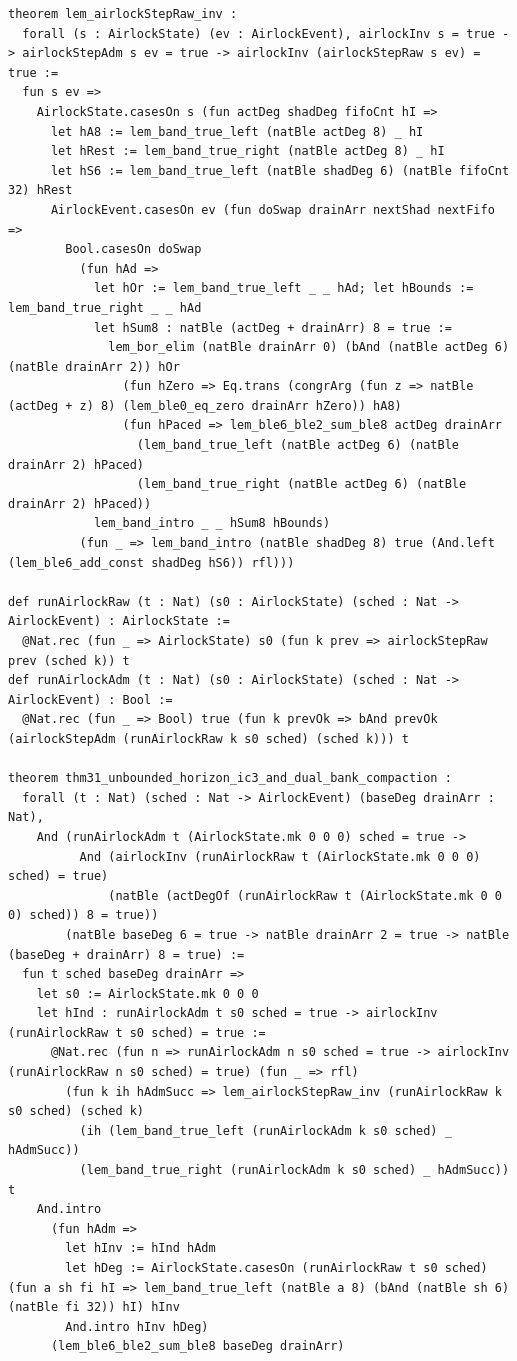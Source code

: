 \documentclass[11pt,letterpaper]{article}
\theoremstyle{spectralthm}
\begin{document}
\begin{lstlisting}[language=Lean4,caption={Standalone Pure Init.Prelude Term-Mode Lean 4 Kernel Suite (thm30--thm61, v0.0.0, 0 sorry, 0 axioms).},label={lst:lean_unified}]
theorem lem_airlockStepRaw_inv :
  forall (s : AirlockState) (ev : AirlockEvent), airlockInv s = true -> airlockStepAdm s ev = true -> airlockInv (airlockStepRaw s ev) = true :=
  fun s ev =>
    AirlockState.casesOn s (fun actDeg shadDeg fifoCnt hI =>
      let hA8 := lem_band_true_left (natBle actDeg 8) _ hI
      let hRest := lem_band_true_right (natBle actDeg 8) _ hI
      let hS6 := lem_band_true_left (natBle shadDeg 6) (natBle fifoCnt 32) hRest
      AirlockEvent.casesOn ev (fun doSwap drainArr nextShad nextFifo =>
        Bool.casesOn doSwap
          (fun hAd =>
            let hOr := lem_band_true_left _ _ hAd; let hBounds := lem_band_true_right _ _ hAd
            let hSum8 : natBle (actDeg + drainArr) 8 = true :=
              lem_bor_elim (natBle drainArr 0) (bAnd (natBle actDeg 6) (natBle drainArr 2)) hOr
                (fun hZero => Eq.trans (congrArg (fun z => natBle (actDeg + z) 8) (lem_ble0_eq_zero drainArr hZero)) hA8)
                (fun hPaced => lem_ble6_ble2_sum_ble8 actDeg drainArr
                  (lem_band_true_left (natBle actDeg 6) (natBle drainArr 2) hPaced)
                  (lem_band_true_right (natBle actDeg 6) (natBle drainArr 2) hPaced))
            lem_band_intro _ _ hSum8 hBounds)
          (fun _ => lem_band_intro (natBle shadDeg 8) true (And.left (lem_ble6_add_const shadDeg hS6)) rfl)))

def runAirlockRaw (t : Nat) (s0 : AirlockState) (sched : Nat -> AirlockEvent) : AirlockState :=
  @Nat.rec (fun _ => AirlockState) s0 (fun k prev => airlockStepRaw prev (sched k)) t
def runAirlockAdm (t : Nat) (s0 : AirlockState) (sched : Nat -> AirlockEvent) : Bool :=
  @Nat.rec (fun _ => Bool) true (fun k prevOk => bAnd prevOk (airlockStepAdm (runAirlockRaw k s0 sched) (sched k))) t

theorem thm31_unbounded_horizon_ic3_and_dual_bank_compaction :
  forall (t : Nat) (sched : Nat -> AirlockEvent) (baseDeg drainArr : Nat),
    And (runAirlockAdm t (AirlockState.mk 0 0 0) sched = true ->
          And (airlockInv (runAirlockRaw t (AirlockState.mk 0 0 0) sched) = true)
              (natBle (actDegOf (runAirlockRaw t (AirlockState.mk 0 0 0) sched)) 8 = true))
        (natBle baseDeg 6 = true -> natBle drainArr 2 = true -> natBle (baseDeg + drainArr) 8 = true) :=
  fun t sched baseDeg drainArr =>
    let s0 := AirlockState.mk 0 0 0
    let hInd : runAirlockAdm t s0 sched = true -> airlockInv (runAirlockRaw t s0 sched) = true :=
      @Nat.rec (fun n => runAirlockAdm n s0 sched = true -> airlockInv (runAirlockRaw n s0 sched) = true) (fun _ => rfl)
        (fun k ih hAdmSucc => lem_airlockStepRaw_inv (runAirlockRaw k s0 sched) (sched k)
          (ih (lem_band_true_left (runAirlockAdm k s0 sched) _ hAdmSucc))
          (lem_band_true_right (runAirlockAdm k s0 sched) _ hAdmSucc)) t
    And.intro
      (fun hAdm =>
        let hInv := hInd hAdm
        let hDeg := AirlockState.casesOn (runAirlockRaw t s0 sched) (fun a sh fi hI => lem_band_true_left (natBle a 8) (bAnd (natBle sh 6) (natBle fi 32)) hI) hInv
        And.intro hInv hDeg)
      (lem_ble6_ble2_sum_ble8 baseDeg drainArr)


\end{lstlisting}
\end{document}
